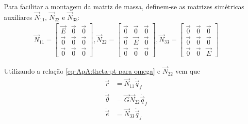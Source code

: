Para facilitar a montagem da matriz de massa, definem-se as matrizes simétricas
auxiliares $\vec{N}_{11}$, $\vec{N}_{22}$ e $\vec{N}_{33}$:
\begin{align}
 \vec{N}_{11} = \begin{bmatrix}
            \vec{E} & \vec{0} & \vec{0} \\
            \vec{0} & \vec{0} & \vec{0}\\
            \vec{0} & \vec{0} & \vec{0}
           \end{bmatrix},
 \vec{N}_{22} = \begin{bmatrix}
            \vec{0} & \vec{0} & \vec{0} \\
            \vec{0} & \vec{E} & \vec{0}\\
            \vec{0} & \vec{0} & \vec{0}
           \end{bmatrix},
 \vec{N}_{33} = \begin{bmatrix}
            \vec{0} & \vec{0} & \vec{0} \\
            \vec{0} & \vec{0} & \vec{0}\\
            \vec{0} & \vec{0} & \vec{E}
           \end{bmatrix}
\end{align}

Utilizando a relação \eqref{eq-ApA:theta-pt para omega} e $\vec{N}_{22}$ vem
que
\begin{subequations}
\label{eq-apA:relações entre velocidades generalizadas}
\begin{align}
 \dot{\vec{r}} &= \vec{N}_{11} \dot{\vec{q}}_f \label{eq-apA:r = Nq}\\
 \dot{\vec{\theta}} &= \vec{G}\vec{N}_{22} \dot{\vec{q}}_f  \label{eq-apA:omega
= Nq}\\
 \dot{\vec{e}} &= \vec{N}_{33} \dot{\vec{q}}_f \label{eq-apA:e = Nq}
\end{align}
\end{subequations}

